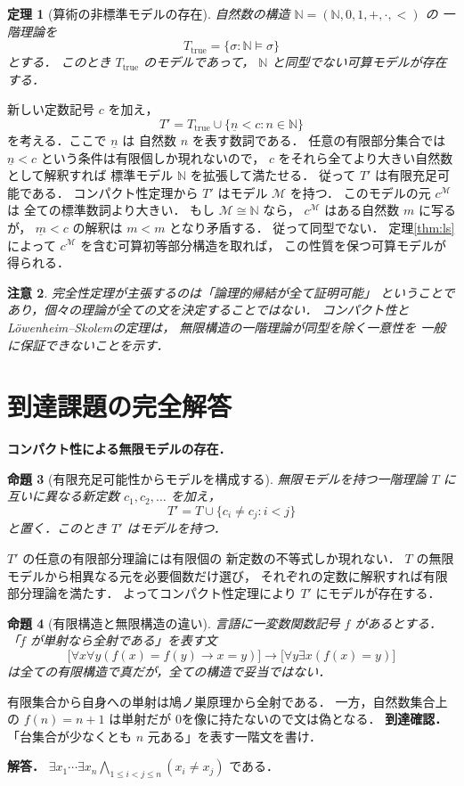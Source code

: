 \documentclass[a5paper,10pt,onecolumn]{jsarticle}
\makeatletter
\theoremstyle{mathnotetheorem}
\newtheorem{theorem}{定理}[section]
\newtheorem{proposition}[theorem]{命題}
\newtheorem{remark}[theorem]{注意}
\renewcommand{\proofname}{証明}
\renewenvironment{proof}[1][\proofname]{%
  \par\pushQED{\qed}\normalfont\topsep4\p@\@plus2\p@\relax
  \trivlist\item[\hskip\labelsep\bfseries #1]\ignorespaces
}{\popQED\endtrivlist\@endpefalse}
\makeatother
\begin{document}
\begin{theorem}[算術の非標準モデルの存在]\label{thm:nonstandard}
自然数の構造
$\mathbb N=(\mathbb N,0,1,+,\cdot,<)$ の
一階理論を
\[
 T_{\mathrm{true}}
 =\{\sigma:\mathbb N\models\sigma\}
\]
とする．
このとき $T_{\mathrm{true}}$ のモデルであって，
$\mathbb N$ と同型でない可算モデルが存在する．
\end{theorem}
\begin{proof}
新しい定数記号 $c$ を加え，
\[
 T'=T_{\mathrm{true}}\cup
 \{\underline n<c:n\in\mathbb N\}
\]
を考える．ここで $\underline n$ は
自然数 $n$ を表す数詞である．
任意の有限部分集合では
$\underline n<c$ という条件は有限個しか現れないので，
$c$ をそれら全てより大きい自然数として解釈すれば
標準モデル $\mathbb N$ を拡張して満たせる．
従って $T'$ は有限充足可能である．
コンパクト性定理から $T'$ はモデル $\mathcal M$ を持つ．
このモデルの元 $c^{\mathcal M}$ は
全ての標準数詞より大きい．
もし $\mathcal M\cong\mathbb N$ なら，
$c^{\mathcal M}$ はある自然数 $m$ に写るが，
$\underline m<c$ の解釈は $m<m$ となり矛盾する．
従って同型でない．
定理\ref{thm:ls}によって
$c^{\mathcal M}$ を含む可算初等部分構造を取れば，
この性質を保つ可算モデルが得られる．
\end{proof}

\begin{remark}
完全性定理が主張するのは「論理的帰結が全て証明可能」
ということであり，個々の理論が全ての文を決定することではない．
コンパクト性とL\"owenheim--Skolemの定理は，
無限構造の一階理論が同型を除く一意性を
一般に保証できないことを示す．
\end{remark}

\section{到達課題の完全解答}
\noindent\textbf{コンパクト性による無限モデルの存在．}
\begin{proposition}[有限充足可能性からモデルを構成する]
無限モデルを持つ一階理論 $T$ に
互いに異なる新定数 $c_1,c_2,\ldots$ を加え，
\[
T'=T\cup\{c_i\ne c_j:i<j\}
\]
と置く．このとき $T'$ はモデルを持つ．
\end{proposition}
\begin{proof}
$T'$ の任意の有限部分理論には有限個の
新定数の不等式しか現れない．
$T$ の無限モデルから相異なる元を必要個数だけ選び，
それぞれの定数に解釈すれば有限部分理論を満たす．
よってコンパクト性定理により $T'$ にモデルが存在する．
\end{proof}
\begin{proposition}[有限構造と無限構造の違い]
言語に一変数関数記号 $f$ があるとする．
「$f$ が単射なら全射である」を表す文
\[
\bigl[\forall x\forall y(f(x)=f(y)\to x=y)\bigr]
\to\bigl[\forall y\exists x(f(x)=y)\bigr]
\]
は全ての有限構造で真だが，全ての構造で妥当ではない．
\end{proposition}
\begin{proof}
有限集合から自身への単射は鳩ノ巣原理から全射である．
一方，自然数集合上の $f(n)=n+1$ は単射だが
0を像に持たないので文は偽となる．
\end{proof}
\noindent\textbf{到達確認．}
「台集合が少なくとも $n$ 元ある」を表す一階文を書け．
\par\noindent\textbf{解答．}
$\exists x_1\cdots\exists x_n
\bigwedge_{1\le i<j\le n}(x_i\ne x_j)$ である．
\end{document}
